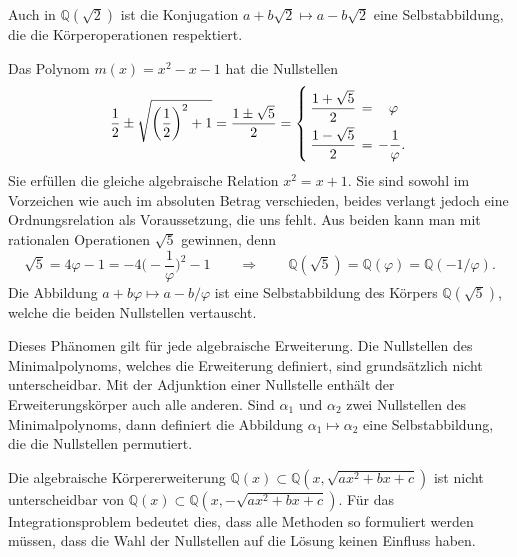 Auch in $\mathbb{Q}(\!\sqrt{2})$ ist die Konjugation
$a+b\sqrt{2}\mapsto a-b\sqrt{2}$ eine Selbstabbildung, die
die Körperoperationen respektiert.

Das Polynom $m(x)=x^2-x-1$ hat die Nullstellen
\[
\frac12 \pm\sqrt{\biggl(\frac12\biggr)^2+1}
=
\frac{1\pm\sqrt{5}}{2}
=
\left\{
\bgroup
\renewcommand{\arraystretch}{2.20}
\renewcommand{\arraycolsep}{2pt}
\begin{array}{lcl}
\displaystyle
\frac{1+\sqrt{5}}{2} &=& \phantom{-}\varphi \\
\displaystyle
\frac{1-\sqrt{5}}{2} &=& \displaystyle-\frac{1}{\varphi}.
\end{array}
\egroup
\right.
\]
Sie erfüllen die gleiche algebraische Relation $x^2=x+1$.
Sie sind sowohl im Vorzeichen wie auch im absoluten Betrag 
verschieden, beides verlangt jedoch eine Ordnungsrelation als
Voraussetzung, die uns fehlt.
Aus beiden kann man mit rationalen Operationen $\sqrt{5}$ gewinnen,
denn
\[
\sqrt{5}
=
4\varphi-1
=
-4\biggl(-\frac{1}{\varphi}\biggr)^2-1
\qquad\Rightarrow\qquad
\mathbb{Q}(\!\sqrt{5})
=
\mathbb{Q}(\varphi)
=
\mathbb{Q}(-1/\varphi).
\]
Die Abbildung $a+b\varphi\mapsto a-b/\varphi$ ist eine Selbstabbildung
des Körpers $\mathbb{Q}(\!\sqrt{5})$, welche die beiden Nullstellen 
vertauscht.

Dieses Phänomen gilt für jede algebraische Erweiterung.
Die Nullstellen des Minimalpolynoms, welches die Erweiterung
definiert, sind grundsätzlich nicht unterscheidbar.
Mit der Adjunktion einer Nullstelle enthält der Erweiterungskörper
auch alle anderen.
Sind $\alpha_1$ und $\alpha_2$ zwei Nullstellen des Minimalpolynoms,
dann definiert die Abbildung $\alpha_1\mapsto\alpha_2$ eine Selbstabbildung,
die die Nullstellen permutiert.

Die algebraische Körpererweiterung
$\mathbb{Q}(x)\subset \mathbb{Q}(x,\sqrt{ax^2+bx+c})$
ist nicht unterscheidbar von
$\mathbb{Q}(x)\subset \mathbb{Q}(x,-\!\sqrt{ax^2+bx+c})$.
Für das Integrationsproblem bedeutet dies, dass alle Methoden so
formuliert werden müssen, dass die Wahl der Nullstellen auf die
Lösung keinen Einfluss haben.



